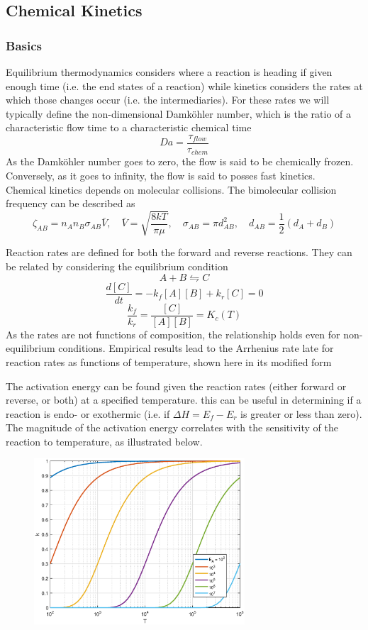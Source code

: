 \documentclass[11pt]{article}
\newcommand{\CenteredBoxed}[1]{\begin{center}\boxed{#1}\end{center}}
\begin{document}
\subsection{Chemical Kinetics}
\subsubsection{Basics}
Equilibrium thermodynamics considers where a reaction is heading if given enough time (i.e. the end states of a reaction) while kinetics considers the rates at which those changes occur (i.e. the intermediaries). For these rates we will typically define the non-dimensional Damk{\"o}hler number, which is the ratio of a characteristic flow time to a characteristic chemical time
$$Da = \frac{\tau_{flow}}{\tau_{chem}}$$
As the Damk{\"o}hler number goes to zero, the flow is said to be chemically frozen. Conversely, as it goes to infinity, the flow is said to posses fast kinetics.\\

Chemical kinetics depends on molecular collisions. The bimolecular collision frequency can be described as
$$\zeta_{AB} = n_An_B\sigma_{AB}\bar{V},\quad \bar{V}=\sqrt{\frac{8kT}{\pi\mu}}, \quad \sigma_{AB} = \pi d_{AB}^2,\quad d_{AB} = \frac{1}{2}(d_A+d_B)$$

Reaction rates are defined for both the forward and reverse reactions. They can be related by considering the equilibrium condition
$$A + B \leftrightharpoons C$$
$$\frac{d[C]}{dt} = -k_f[A][B] + k_r[C]= 0$$
$$\frac{k_f}{k_r} = \frac{[C]}{[A][B]} = K_c(T)$$
As the rates are not functions of composition, the relationship holds even for non-equilibrium conditions. Empirical results lead to the Arrhenius rate late for reaction rates as functions of temperature, shown here in its modified form
\CenteredBoxed{k = AT^b\exp\left(\frac{-E_A}{RT}\right)}
The activation energy can be found given the reaction rates (either forward or reverse, or both) at a specified temperature. this can be useful in determining if a reaction is endo- or exothermic (i.e. if $\Delta H = E_f-E_r$ is greater or less than zero). The magnitude of the activation energy correlates with the sensitivity of the reaction to temperature, as illustrated below.
\begin{figure}[h]
\centering
\includegraphics[width=0.7\textwidth]{Graphics/k_vs_T.eps}
\end{figure}
\end{document}
